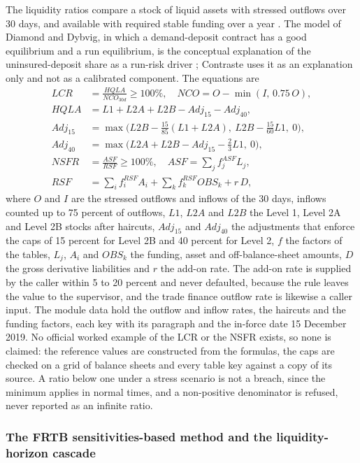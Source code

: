 The liquidity ratios compare a stock of liquid assets with stressed outflows over 30 days, and available with required stable funding over a year \citep{ccr:lcr,ccr:nsf}. The model of Diamond and Dybvig, in which a demand-deposit contract has a good equilibrium and a run equilibrium, is the conceptual explanation of the uninsured-deposit share as a run-risk driver \citep{ccr:diamond1983}; Contraste uses it as an explanation only and not as a calibrated component. The equations are
\begin{equation}
\begin{aligned}
LCR&=\frac{HQLA}{NCO_{30d}}\ge100\%,\quad NCO=O-\min(I,\,0.75\,O),\\
HQLA&=L1+L2A+L2B-Adj_{15}-Adj_{40},\\
Adj_{15}&=\max\!\Big(L2B-\tfrac{15}{85}(L1+L2A),\ L2B-\tfrac{15}{60}L1,\ 0\Big),\\
Adj_{40}&=\max\!\Big(L2A+L2B-Adj_{15}-\tfrac23L1,\ 0\Big),\\
NSFR&=\frac{ASF}{RSF}\ge100\%,\quad ASF=\sum_jf^{ASF}_jL_j,\\
RSF&=\sum_if^{RSF}_iA_i+\sum_kf^{RSF}_kOBS_k+r\,D,
\end{aligned}
\label{eq:ccr-liq}
\end{equation}
where $O$ and $I$ are the stressed outflows and inflows of the 30 days, inflows counted up to 75 percent of outflows, $L1$, $L2A$ and $L2B$ the Level 1, Level 2A and Level 2B stocks after haircuts, $Adj_{15}$ and $Adj_{40}$ the adjustments that enforce the caps of 15 percent for Level 2B and 40 percent for Level 2, $f$ the factors of
the tables, $L_j$, $A_i$ and $OBS_k$ the funding, asset and off-balance-sheet amounts, $D$ the gross derivative liabilities and $r$ the add-on rate. The add-on rate is supplied by the caller within 5 to 20 percent and never defaulted, because the rule leaves the value to the supervisor, and the trade finance outflow rate is likewise a caller input. The module data hold the outflow and inflow rates, the haircuts and the funding factors, each key with its paragraph and the in-force date 15 December 2019.
No official worked example of the LCR or the NSFR exists, so none is claimed: the reference values are constructed from the formulas, the caps are checked on a grid of balance sheets and every table key against a copy of its source. A ratio below one under a stress scenario is not a breach, since the minimum applies in normal times, and a non-positive denominator is refused, never reported as an infinite ratio.

\subsubsection{The FRTB sensitivities-based method and the liquidity-horizon cascade}

